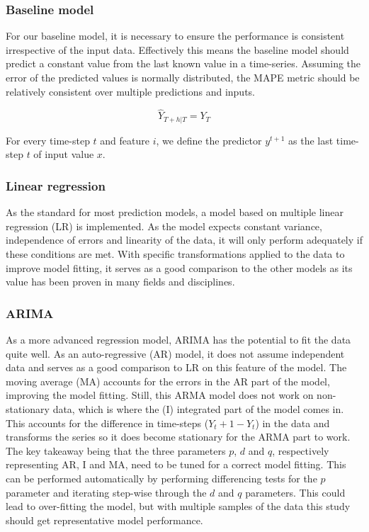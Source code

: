 \subsubsection{Baseline model}

For our baseline model, it is necessary to ensure the performance is consistent irrespective of the input data. Effectively this means the baseline model should predict a constant value from the last known value in a time-series. Assuming the error of the predicted values is normally distributed, the MAPE metric should be relatively consistent over multiple predictions and inputs.

$$\hat{Y}_{T+h|T} = Y_T$$

For every time-step $t$ and feature $i$, we define the predictor $y^{t+1}$ as the last time-step $t$ of input value $x$.

\subsubsection{Linear regression}

As the standard for most prediction models, a model based on multiple linear regression (LR) is implemented. As the model expects constant variance, independence of errors and linearity of the data, it will only perform adequately if these conditions are met. With specific transformations applied to the data to improve model fitting, it serves as a good comparison to the other models as its value has been proven in many fields and disciplines. 

\subsubsection{ARIMA}

As a more advanced regression model, ARIMA has the potential to fit the data quite well. As an auto-regressive (AR) model, it does not assume independent data and serves as a good comparison to LR on this feature of the model. The moving average (MA) accounts for the errors in the AR part of the model, improving the model fitting. Still, this ARMA model does not work on non-stationary data, which is where the (I) integrated part of the model comes in. This accounts for the difference in time-steps ($Y_t+1 - Y_t$) in the data and transforms the series so it does become stationary for the ARMA part to work. The key takeaway being that the three parameters $p$, $d$ and $q$, respectively representing AR, I and MA, need to be tuned for a correct model fitting. This can be performed automatically by performing differencing tests for the $p$ parameter and iterating step-wise through the $d$ and $q$ parameters. This could lead to over-fitting the model, but with multiple samples of the data this study should get representative model performance.

